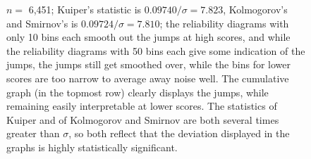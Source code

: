 \documentclass{article}
\begin{document}
\begin{figure}
\begin{centering}
\end{centering}
\caption{$n =$ 6,451; Kuiper's statistic is $0.09740 / \sigma = 7.823$,
         Kolmogorov's and Smirnov's is $0.09724 / \sigma = 7.810$;
         the reliability diagrams with only 10 bins each smooth out the jumps
         at high scores, and while the reliability diagrams with 50 bins each
         give some indication of the jumps, the jumps still get smoothed over,
         while the bins for lower scores are too narrow to average away noise
         well. The cumulative graph (in the topmost row) clearly displays
         the jumps, while remaining easily interpretable at lower scores.
         The statistics of Kuiper and of Kolmogorov and Smirnov are both
         several times greater than $\sigma$,
         so both reflect that the deviation displayed in the graphs
         is highly statistically significant.
}
\label{ex0}
\end{figure}
\end{document}
